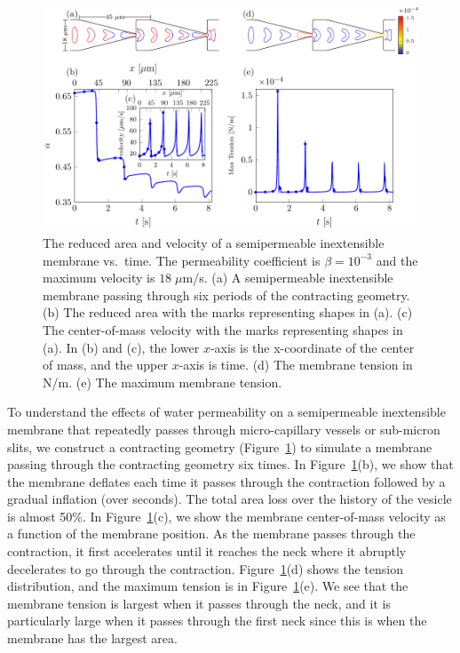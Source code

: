 \documentclass[prb,preprint,showpacs,preprintnumbers,amsmath,amssymb,longbibliography]{revtex4-1}
\newif\ifTikz
\begin{document}
\begin{figure}[hbp]
  \centering
  \ifTikz
  
  \else
  \includegraphics{figures/contractingComposite2.pdf}
  \fi
  \caption{\label{fig:contractingComposite2} The reduced area and
  velocity of a semipermeable inextensible membrane vs.~time. The
  permeability coefficient is $\beta = 10^{-3}$ and the maximum velocity
  is $18\;\mu$m/s. (a) A semipermeable inextensible membrane passing
  through six periods of the contracting geometry. (b) The reduced area
  with the marks representing shapes in (a). (c) The center-of-mass
  velocity with the marks representing shapes in (a). In (b) and (c),
  the lower $x$-axis is the x-coordinate of the center of mass, and the
  upper $x$-axis is time. (d) The membrane tension in N/m. (e) The
  maximum membrane tension.}
\end{figure}
To understand the effects of water permeability on a semipermeable
inextensible membrane that repeatedly passes through micro-capillary
vessels or sub-micron slits, we construct a contracting geometry
(Figure~\ref{fig:contractingComposite2}) to simulate a membrane passing
through the contracting geometry six times. In
Figure~\ref{fig:contractingComposite2}(b), we show that the membrane
deflates each time it passes through the contraction followed by a
gradual inflation (over seconds). The total area loss over the history
of the vesicle is almost 50\%. In
Figure~\ref{fig:contractingComposite2}(c), we show the membrane
center-of-mass velocity as a function of the membrane position. As the
membrane passes through the contraction, it first accelerates until it
reaches the neck where it abruptly decelerates to go through the
contraction.  Figure~\ref{fig:contractingComposite2}(d) shows the
tension distribution, and the maximum tension is in
Figure~\ref{fig:contractingComposite2}(e). We see that the membrane
tension is largest when it passes through the neck, and it is
particularly large when it passes through the first neck since this is
when the membrane has the largest area.
\end{document}
